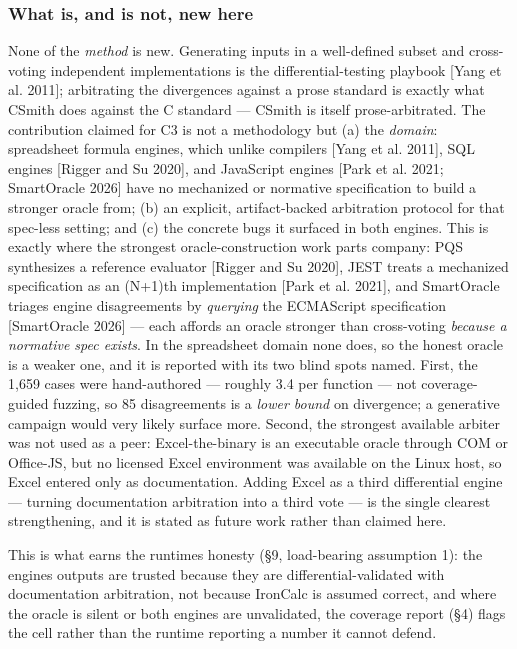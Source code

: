 \documentclass[
]{article}
\newcounter{none} %
\begin{document}
\subsubsection{What is, and is not, new
here}\label{what-is-and-is-not-new-here}

None of the \emph{method} is new. Generating inputs in a well-defined
subset and cross-voting independent implementations is the
differential-testing playbook {[}Yang et al. 2011{]}; arbitrating the
divergences against a prose standard is exactly what CSmith does against
the C standard --- CSmith is itself prose-arbitrated. The contribution
claimed for C3 is not a methodology but (a) the \emph{domain}:
spreadsheet formula engines, which unlike compilers {[}Yang et al.
2011{]}, SQL engines {[}Rigger and Su 2020{]}, and JavaScript engines
{[}Park et al. 2021; SmartOracle 2026{]} have no mechanized or normative
specification to build a stronger oracle from; (b) an explicit,
artifact-backed arbitration protocol for that spec-less setting; and (c)
the concrete bugs it surfaced in both engines. This is exactly where the
strongest oracle-construction work parts company: PQS synthesizes a
reference evaluator {[}Rigger and Su 2020{]}, JEST treats a mechanized
specification as an (N+1)th implementation {[}Park et al. 2021{]}, and
SmartOracle triages engine disagreements by \emph{querying} the
ECMAScript specification {[}SmartOracle 2026{]} --- each affords an
oracle stronger than cross-voting \emph{because a normative spec
exists}. In the spreadsheet domain none does, so the honest oracle is a
weaker one, and it is reported with its two blind spots named. First,
the 1,659 cases were hand-authored --- roughly 3.4 per function --- not
coverage-guided fuzzing, so 85 disagreements is a \emph{lower bound} on
divergence; a generative campaign would very likely surface more.
Second, the strongest available arbiter was not used as a peer:
Excel-the-binary is an executable oracle through COM or Office-JS, but
no licensed Excel environment was available on the Linux host, so Excel
entered only as documentation. Adding Excel as a third differential
engine --- turning documentation arbitration into a third vote --- is
the single clearest strengthening, and it is stated as future work
rather than claimed here.

This is what earns the runtime\textquotesingle s honesty (§9,
load-bearing assumption 1): the engine\textquotesingle s outputs are
trusted because they are differential-validated with documentation
arbitration, not because IronCalc is assumed correct, and where the
oracle is silent or both engines are unvalidated, the coverage report
(§4) flags the cell rather than the runtime reporting a number it cannot
defend.
\end{document}
